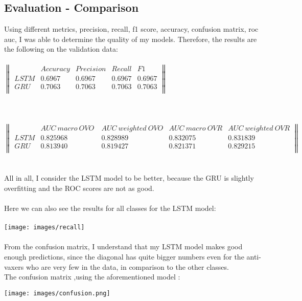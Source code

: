 \documentclass{article}
\begin{document}
\subsection{Evaluation - Comparison}
Using different metrics, precision, recall, f1 score, accuracy, confusion matrix, roc auc, I was able to determine the quality of my models. Therefore, the results are the following on the validation data: \\ \\
$
\begin{Vmatrix}
& Accuracy & Precision &  Recall & F1 \\
LSTM & 0.6967 & 0.6967 & 0.6967 & 0.6967\\
GRU & 0.7063 & 0.7063 & 0.7063 & 0.7063\\
\end{Vmatrix} 
$ \\ \\ \\ \\
$
\begin{Vmatrix}
& AUC\ macro\ OVO\ & AUC\ weighted\ OVO  &  AUC\ macro\ OVR & AUC\ weighted\ OVR  \\
LSTM & 0.825968 & 0.828989 & 0.832075 & 0.831839 \\
GRU & 0.813940 & 0.819427  & 0.821371  & 0.829215 \\
\end{Vmatrix} 
$ \\ \\ \\
All in all, I consider the LSTM model to be better, because the GRU is slightly overfitting and the ROC scores are not as good.\\ \\
Here we can also see the results for all classes for the LSTM model: \\ \\
\texttt{[image: images/recall]}
\\ \\
From the confusion matrix, I understand that my LSTM model makes good enough predictions, since the diagonal has quite bigger numbers even for the anti-vaxers who are very few in the data, in comparison to the other classes. \\The confusion matrix ,using the aforementioned model :
\begin{center}
\texttt{[image: images/confusion.png]}
\end{center}
\end{document}
